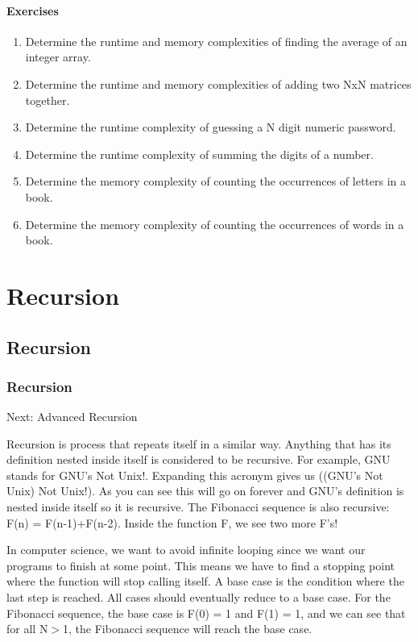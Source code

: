 \documentclass[11pt,oneside]{book}
\begin{document}
\subsection{Exercises}

\begin{enumerate}
\item Determine the runtime and memory complexities of finding the average of an integer array.
\item Determine the runtime and memory complexities of adding two NxN matrices together.
\item Determine the runtime complexity of guessing a N digit numeric password.
\item Determine the runtime complexity of summing the digits of a number.
\item Determine the memory complexity of counting the occurrences of letters in a book.
\item Determine the memory complexity of counting the occurrences of words in a book.
\end{enumerate}

\part{ Recursion }
    \chapter{ Recursion }
        \section{ Recursion }
        

Next: Advanced Recursion

Recursion is process that repeats itself in a similar way. Anything that has its definition nested inside itself is considered to be recursive. For example, GNU stands for GNU's Not Unix!. Expanding this acronym gives us ((GNU's Not Unix) Not Unix!). As you can see this will go on forever and GNU's definition is nested inside itself so it is recursive. The Fibonacci sequence is also recursive: F(n) = F(n-1)+F(n-2). Inside the function F, we see two more F's!

In computer science, we want to avoid infinite looping since we want our programs to finish at some point. This means we have to find a stopping point where the function will stop calling itself. A base case is the condition where the last step is reached. All cases should eventually reduce to a base case. For the Fibonacci sequence, the base case is F(0) = 1 and F(1) = 1, and we can see that for all N$>$1, the Fibonacci sequence will reach the base case.
\end{document}

